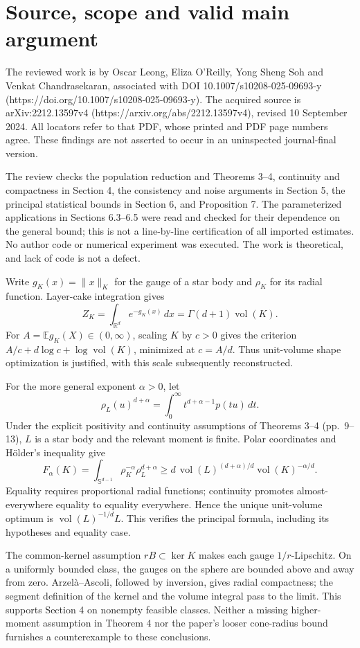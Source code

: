 \documentclass[10pt]{article}
\begin{document}
\section*{Source, scope and valid main argument}
The reviewed work is by Oscar Leong, Eliza O’Reilly, Yong Sheng Soh and Venkat Chandrasekaran, associated with DOI 10.1007/s10208-025-09693-y (https://doi.org/10.1007/s10208-025-09693-y). The acquired source is arXiv:2212.13597v4 (https://arxiv.org/abs/2212.13597v4), revised 10 September 2024. All locators refer to that PDF, whose printed and PDF page numbers agree. These findings are not asserted to occur in an uninspected journal-final version.\par
The review checks the population reduction and Theorems 3–4, continuity and compactness in Section 4, the consistency and noise arguments in Section 5, the principal statistical bounds in Section 6, and Proposition 7. The parameterized applications in Sections 6.3–6.5 were read and checked for their dependence on the general bound; this is not a line-by-line certification of all imported estimates. No author code or numerical experiment was executed. The work is theoretical, and lack of code is not a defect.\par
Write \(g_K(x)=\|x\|_K\) for the gauge of a star body and \(\rho_K\) for its radial function. Layer-cake integration gives \[Z_K=\int_{\mathbb R^d}e^{-g_K(x)}\,dx=\Gamma(d+1)\operatorname{vol}(K).\] For \(A=\mathbb Eg_K(X)\in(0,\infty)\), scaling \(K\) by \(c>0\) gives the criterion \(A/c+d\log c+\log\operatorname{vol}(K)\), minimized at \(c=A/d\). Thus unit-volume shape optimization is justified, with this scale subsequently reconstructed.\par
For the more general exponent \(\alpha>0\), let \[\rho_L(u)^{d+\alpha}=\int_0^\infty t^{d+\alpha-1}p(tu)\,dt .\] Under the explicit positivity and continuity assumptions of Theorems 3–4 (pp. 9–13), \(L\) is a star body and the relevant moment is finite. Polar coordinates and Hölder’s inequality give \[F_\alpha(K)=\int_{\mathbb S^{d-1}}\rho_K^{-\alpha}\rho_L^{d+\alpha}
 \ge d\,\operatorname{vol}(L)^{(d+\alpha)/d}\operatorname{vol}(K)^{-\alpha/d}.\] Equality requires proportional radial functions; continuity promotes almost-everywhere equality to equality everywhere. Hence the unique unit-volume optimum is \(\operatorname{vol}(L)^{-1/d}L\). This verifies the principal formula, including its hypotheses and equality case.\par
The common-kernel assumption \(rB\subset\ker K\) makes each gauge \(1/r\)-Lipschitz. On a uniformly bounded class, the gauges on the sphere are bounded above and away from zero. Arzelà–Ascoli, followed by inversion, gives radial compactness; the segment definition of the kernel and the volume integral pass to the limit. This supports Section 4 on nonempty feasible classes. Neither a missing higher-moment assumption in Theorem 4 nor the paper’s looser cone-radius bound furnishes a counterexample to these conclusions.\par
\end{document}
